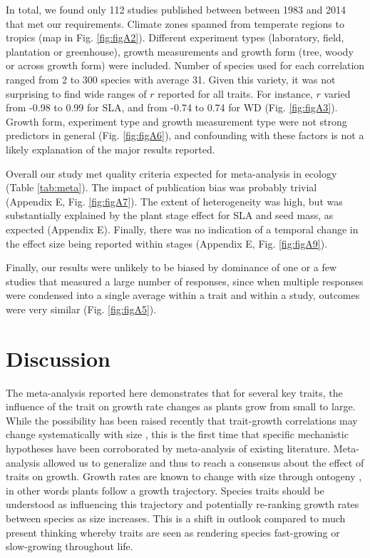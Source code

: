 \documentclass[a4paper,11pt]{article}
\begin{document}
In total, we found only 112 studies published between between 1983 and 2014 that met our requirements. Climate zones spanned from temperate regions to tropics (map in Fig. \ref{fig:figA2}). Different experiment types (laboratory, field, plantation or greenhouse), growth measurements and growth form (tree, woody or across growth form) were included. Number of species used for each correlation ranged from 2 to 300 species with average 31. Given this variety, it was not surprising to find wide ranges of $r$ reported for all traits. For instance, $r$ varied from -0.98 to 0.99 for SLA, and from -0.74 to 0.74 for WD (Fig. \ref{fig:figA3}). Growth form, experiment type and growth measurement type were not strong predictors in general (Fig. \ref{fig:figA6}), and confounding with these factors is not a likely explanation of the major results reported.

Overall our study met quality criteria expected for meta-analysis in ecology (Table \ref{tab:meta}). The impact of publication bias was probably trivial (Appendix E, Fig. \ref{fig:figA7}). The extent of heterogeneity was high, but was substantially explained by the plant stage effect for SLA and seed mass, as expected (Appendix E). Finally, there was no indication of a temporal change in the effect size being reported within stages (Appendix E, Fig. \ref{fig:figA9}).

Finally, our results were unlikely to be biased by dominance of one or a few studies that measured a large number of responses, since when multiple responses were condensed into a single average within a trait and within a study, outcomes were very similar (Fig. \ref{fig:figA5}).


\section*{Discussion}\label{discussion}

The meta-analysis reported here demonstrates that for several key traits, the influence of the trait on growth rate changes as plants grow from small to large. While the possibility has been raised recently that trait-growth correlations may change systematically with size \citep{Falster:2011ii, Ruger:2012jv, Iida:2014ep, Iida:2014hq}, this is the first time that specific mechanistic hypotheses have been corroborated by meta-analysis of existing literature. Meta-analysis allowed us to generalize and thus to reach a consensus about the effect of traits on growth. Growth rates are known to change with size through ontogeny \citep{Condit:1993hd, Clark:1999ed, Herault:2011dd}, in other words plants follow a growth trajectory. Species traits should be understood as influencing this trajectory and potentially re-ranking growth rates between species as size increases. This is a shift in outlook compared to much present thinking whereby traits are seen as rendering species fast-growing or slow-growing throughout life.
\end{document}
